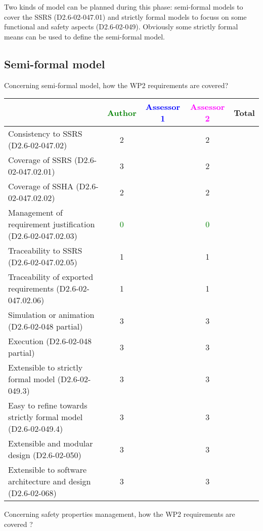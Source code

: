 Two kinds of model can be planned during this phase: semi-formal models to  cover the SSRS (D2.6-02-047.01) and strictly formal  models to  focuss on some functional and safety aspects (D2.6-02-049).  Obviously some strictly  formal means can be used to define the semi-formal  model.

\subsection{Semi-formal model}

Concerning semi-formal model, how the WP2 requirements are covered?

\begin{tabular}{|l | c | c | c | c|}
\hline
& \textcolor{green}{Author} & \textcolor{blue}{Assessor 1} & \textcolor{magenta}{Assessor 2} & Total \\
\hline 
Consistency to SSRS (D2.6-02-047.02) & 2    & & 2    &  \\
\hline
Coverage of SSRS (D2.6-02-047.02.01)  & 3    & & 2    &  \\
\hline
Coverage of SSHA (D2.6-02-047.02.02)  & 2    & & 2    &  \\
\hline
Management of requirement justification (D2.6-02-047.02.03)  & \textcolor{green}{0} & & \textcolor{green}{0} &  \\
\hline
Traceability to  SSRS (D2.6-02-047.02.05)  & 1    & & 1    &  \\
\hline
Traceability of exported requirements (D2.6-02-047.02.06)  & 1    & & 1    &  \\
\hline
Simulation or animation (D2.6-02-048 partial)  & 3    & & 3    &  \\
\hline
Execution (D2.6-02-048 partial)  & 3    & & 3    &  \\
\hline
Extensible to strictly formal model (D2.6-02-049.3) & 3    & & 3    &  \\
\hline
Easy to  refine towards strictly formal model (D2.6-02-049.4) & 3    & & 3    &  \\
\hline
Extensible and modular design (D2.6-02-050)  & 3    & & 3    &  \\
\hline
Extensible to software architecture and design (D2.6-02-068)   & 3    & & 3    &  \\
\hline
\end{tabular}

Concerning safety properties management, how the WP2 requirements are covered ?

